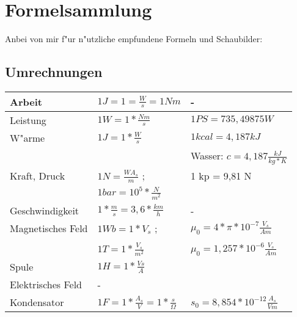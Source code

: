 \chapter{Formelsammlung}

Anbei von mir f"ur n"utzliche empfundene Formeln und Schaubilder:

\section{Umrechnungen}
\begin{table}[h!]
\begin{tabular}[t]{|l|l|l|}
\hline
Arbeit   & $1 J = 1 = \frac{W}{s} = 1 Nm$ & -\\
\hline
Leistung & $1 W = 1 * \frac{Nm}{s}$ & $1 PS = 735,49875 W$ \\
\hline
W"arme   & $1 J = 1 * \frac{W}{s}$  & $1 kcal = 4,187 kJ$  \\
         &                          & Wasser: $c = 4,187 \frac{kJ}{kg * K}$\\
\hline
Kraft, Druck &  $1 N = \frac{WA_s}{m}$ ;  & 1 kp = 9,81 N \\
             &  $1 bar = 10^5 * \frac{N}{m^2}$ & \\
\hline
Geschwindigkeit & $1 * \frac{m}{s} = 3,6 * \frac{km}{h}$ & -\\
\hline
Magnetisches Feld & $1 Wb = 1 * V_s$ ; & $\mu_0 = 4 * \pi * 10^{-7} \frac{V_s}{Am}$ \\
                  &                             & \\
                  & $1 T = 1 * \frac{V_s}{m^2}$ & $\mu_0 = 1,257 * 10^{-6} \frac{V_s}{Am}$\\
\hline
Spule & $1 H = 1 * \frac{Vs}{A}$ & \\
\hline
Elektrisches Feld & - &\\
Kondensator & $1 F = 1 * \frac{A_s}{V} = 1 * \frac{s}{\Omega}$ & $s_0 = 8,854 * 10^{-12} \frac{A_s}{Vm}$ \\
\hline
\end{tabular}
\end{table}


